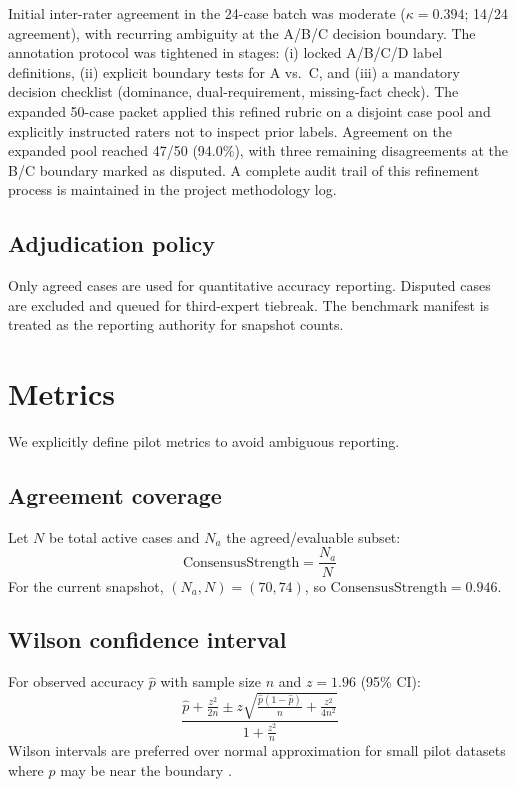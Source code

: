 \documentclass[pdflatex,sn-basic,Numbered]{sn-jnl}
\begin{document}
Initial inter-rater agreement in the 24-case batch was moderate ($\kappa = 0.394$; 14/24 agreement), with recurring ambiguity at the A/B/C decision boundary.
The annotation protocol was tightened in stages: (i) locked A/B/C/D label definitions, (ii) explicit boundary tests for A vs.\ C, and (iii) a mandatory decision checklist (dominance, dual-requirement, missing-fact check).
The expanded 50-case packet applied this refined rubric on a disjoint case pool and explicitly instructed raters not to inspect prior labels.
Agreement on the expanded pool reached 47/50 (94.0\%), with three remaining disagreements at the B/C boundary marked as disputed.
A complete audit trail of this refinement process is maintained in the project methodology log.

\subsection{Adjudication policy}\label{subsec:adjudication}

Only agreed cases are used for quantitative accuracy reporting.
Disputed cases are excluded and queued for third-expert tiebreak.
The benchmark manifest is treated as the reporting authority for snapshot counts.

\section{Metrics}\label{sec:metrics}

We explicitly define pilot metrics to avoid ambiguous reporting.

\subsection{Agreement coverage}\label{subsec:consensus}

Let $N$ be total active cases and $N_a$ the agreed/evaluable subset:
\begin{equation}
\mathrm{ConsensusStrength} = \frac{N_a}{N}
\end{equation}
For the current snapshot, $(N_a, N) = (70, 74)$, so $\mathrm{ConsensusStrength} = 0.946$.

\subsection{Wilson confidence interval}\label{subsec:wilson}

For observed accuracy $\hat{p}$ with sample size $n$ and $z=1.96$ (95\% CI):
\begin{equation}
\frac{\hat{p} + \frac{z^2}{2n} \pm z\sqrt{\frac{\hat{p}(1-\hat{p})}{n}+\frac{z^2}{4n^2}}}{1+\frac{z^2}{n}}
\label{eq:wilson}
\end{equation}
Wilson intervals are preferred over normal approximation for small pilot datasets where $\hat{p}$ may be near the boundary \cite{wilson1927probable}.
\end{document}
